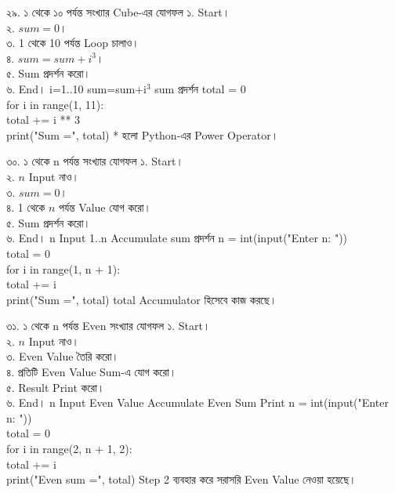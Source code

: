 \exerciseTable
{২৯. ১ থেকে ১০ পর্যন্ত সংখ্যার Cube-এর যোগফল}
{
১. Start।\\
২. \(sum=0\)।\\
৩. 1 থেকে 10 পর্যন্ত Loop চালাও।\\
৪. \(sum=sum+i^3\)।\\
৫. Sum প্রদর্শন করো।\\
৬. End।
}
{
\linearflow
{i=1..10}
{sum=sum+i\(^3\)}
{sum প্রদর্শন}
}
{
total = 0\\
for i in range(1, 11):\\
\hspace*{4mm}total += i ** 3\\
print("Sum =", total)
}
{
\textenglish{\ttfamily **}
হলো Python-এর Power Operator।
}


\exerciseTable
{৩০. ১ থেকে n পর্যন্ত সংখ্যার যোগফল}
{
১. Start।\\
২. \(n\) Input নাও।\\
৩. \(sum=0\)।\\
৪. 1 থেকে \(n\) পর্যন্ত Value যোগ করো।\\
৫. Sum প্রদর্শন করো।\\
৬. End।
}
{
\linearflow
{n Input}
{1..n Accumulate}
{sum প্রদর্শন}
}
{
n = int(input("Enter n: "))\\
total = 0\\
for i in range(1, n + 1):\\
\hspace*{4mm}total += i\\
print("Sum =", total)
}
{
\textenglish{\ttfamily total}
Accumulator হিসেবে কাজ করছে।
}


\exerciseTable
{৩১. ১ থেকে n পর্যন্ত Even সংখ্যার যোগফল}
{
১. Start।\\
২. \(n\) Input নাও।\\
৩. Even Value তৈরি করো।\\
৪. প্রতিটি Even Value Sum-এ যোগ করো।\\
৫. Result Print করো।\\
৬. End।
}
{
\linearflow
{n Input}
{Even Value Accumulate}
{Even Sum Print}
}
{
n = int(input("Enter n: "))\\
total = 0\\
for i in range(2, n + 1, 2):\\
\hspace*{4mm}total += i\\
print("Even sum =", total)
}
{
Step 2 ব্যবহার করে সরাসরি Even Value নেওয়া হয়েছে।
}

